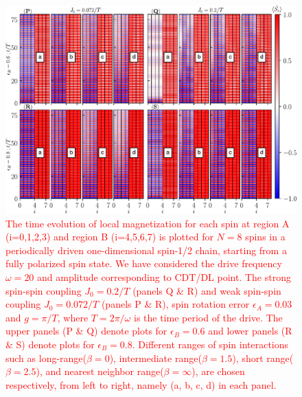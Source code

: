 \documentclass[12pt]{iopart}
\newcommand{\red}[1]{\textcolor{red}{#1}}
\begin{document}
\begin{figure}[t!]
	\centering
	\hspace{2cm}\includegraphics[width=13.5cm]{figure7.pdf}
	\caption{\red{The time evolution of local magnetization for each spin at region A (i=0,1,2,3) and region B (i=4,5,6,7) is plotted for $N=8$ spins in a periodically driven one-dimensional spin-1/2 chain, starting from a fully polarized spin state. We have considered the drive frequency $\omega=20$ and amplitude corresponding to CDT/DL point. The strong spin-spin coupling $J_0 = 0.2/T$ (panels Q \& R) and weak spin-spin coupling $J_0 = 0.072/T$ (panels P \& R),  spin rotation error $\epsilon_A = 0.03$ and $g=\pi/T$, where $T=2\pi/\omega$ is the time period of the drive. The upper panels (P \& Q) denote plots for $\epsilon_B=0.6$ and lower panels (R \& S) denote plots for $\epsilon_B=0.8$. Different ranges of spin interactions such as long-range($\beta=0$), intermediate range($\beta=1.5$), short range($\beta=2.5$), and nearest neighbor range($\beta=\infty$), are chosen respectively, from left to right, namely (a, b, c, d) in each panel.}}
	\label{Fig:eb}
\end{figure}
\end{document}
